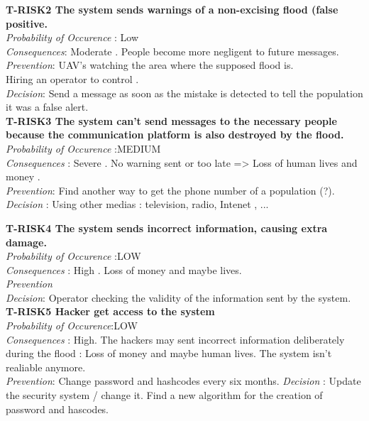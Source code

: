 	
	\textbf{ T-RISK2 The system sends warnings of a non-excising flood (false positive.} \\
	\textit{Probability of Occurence} : Low \\
	\textit{Consequences}: Moderate . People become more negligent to future messages. \\
	\textit{Prevention}: UAV's watching the area where the supposed flood is.\\
	Hiring an operator to control . \\
	\textit{Decision}: Send a message as soon as the mistake is detected to tell the population it was a false alert. \\

	
	\textbf{ T-RISK3 The system can't send messages to the necessary people because the communication platform is also destroyed by the flood.} \\
	\textit{Probability of Occurence} :MEDIUM\\
	\textit{Consequences} : Severe . No warning sent or too late => Loss of human lives and money .\\
	\textit{Prevention}: Find another way to get the phone number of a population (?). \\
	\textit{Decision} : Using other medias : television, radio, Intenet , ...
	
	\textbf{ T-RISK4 The system sends incorrect information, causing extra damage.} \\
	\textit{Probability of Occurence} :LOW\\
	\textit{Consequences} : High . Loss of money and maybe lives.\\
	\textit{Prevention} \\
	\textit{Decision}: Operator checking the validity of the information sent by the system. \\
	
	\textbf{ T-RISK5 Hacker get access to the system} \\
	\textit{Probability of Occurence}:LOW \\
	\textit{Consequences} : High. The hackers may sent incorrect information deliberately during the flood : Loss of money and maybe human lives. The system isn't realiable anymore. \\
	\textit{Prevention}: Change password and hashcodes every six months.
	\textit{Decision} : Update the security system / change it. Find a new algorithm for the creation of password and hascodes. \\

